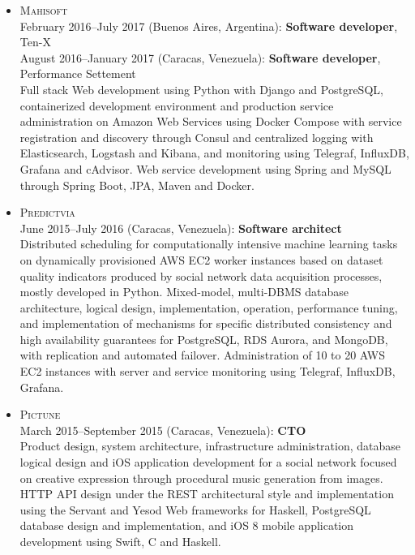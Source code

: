 \documentclass{res}
\begin{document}
\begin{resume}
\begin{itemize}[leftmargin=-0.3in]
    \item
      \textsc{Mahisoft}
      \\ February 2016--July 2017 (Buenos Aires, Argentina): \textbf{Software developer}, Ten-X
      \\ August 2016--January 2017 (Caracas, Venezuela): \textbf{Software developer}, Performance Settement
      \\ \small{Full stack Web development using Python with Django and PostgreSQL, containerized development environment and production service administration on Amazon Web Services using Docker Compose with service registration and discovery through Consul and centralized logging with Elasticsearch, Logstash and Kibana, and monitoring using Telegraf, InfluxDB, Grafana and cAdvisor.  Web service development using Spring and MySQL through Spring Boot, JPA, Maven and Docker.}

    \item
      \textsc{Predictvia}
      \\ June 2015--July 2016 (Caracas, Venezuela): \textbf{Software architect}
      \\ \small{Distributed scheduling for computationally intensive machine learning tasks on dynamically provisioned AWS EC2 worker instances based on dataset quality indicators produced by social network data acquisition processes, mostly developed in Python.  Mixed-model, multi-DBMS database architecture, logical design, implementation, operation, performance tuning, and implementation of mechanisms for specific distributed consistency and high availability guarantees for PostgreSQL, RDS Aurora, and MongoDB, with replication and automated failover.  Administration of 10 to 20 AWS EC2 instances with server and service monitoring using Telegraf, InfluxDB, Grafana.}

    \item
      \textsc{Pictune}
      \\ March 2015--September 2015 (Caracas, Venezuela): \textbf{CTO}
      \\ \small{Product design, system architecture, infrastructure administration, database logical design and iOS application development for a social network focused on creative expression through procedural music generation from images.  HTTP API design under the REST architectural style and implementation using the Servant and Yesod Web frameworks for Haskell, PostgreSQL database design and implementation, and iOS 8 mobile application development using Swift, C and Haskell.}


\end{itemize}
\end{resume}
\end{document}
